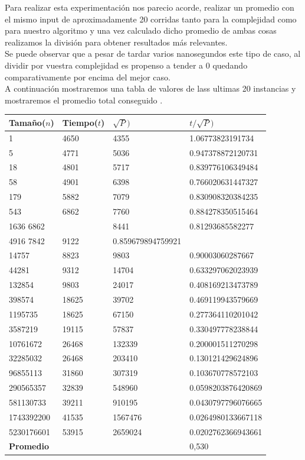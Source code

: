 Para realizar esta experimentaci\'on nos parecio acorde, realizar un promedio con el mismo input de aproximadamente 20 corridas
tanto para la complejidad como para nuestro algoritmo y una vez calculado dicho promedio de ambas cosas realizamos la divisi\'on para
obtener resultados m\'as relevantes.\\ 

Se puede observar que a pesar de tardar varios nanosegundos este tipo de caso, al dividir por vuestra complejidad
es propenso a tender a 0 quedando comparativamente por encima del mejor caso.\\

A continuaci\'on mostraremos una tabla de valores de lass ultimas 20 instancias y
mostraremos el promedio total conseguido .\\


\begin{table}[H]

    \begin{tabular}{ | l | l |l |l |}
    \hline
	Tamaño($n$) & Tiempo($t$) & \textbf{$\sqrt{P})$} & \textbf{$t/\sqrt{P})$}  \\ \hline
1 & 4650	 & 4355 &	1.06773823191734 \\ \hline
5 &	4771	 & 5036	& 0.947378872120731\\ \hline
18 &	4801	 & 5717	& 0.839776106349484\\ \hline
58 &	4901	 & 6398	& 0.766020631447327\\ \hline
179 &	5882	 & 7079	& 0.830908320384235\\ \hline
543	& 6862	&7760 &	0.884278350515464\\ \hline
1636	6862 &	&8441 &	0.81293685582277\\ \hline
4916	7842	 & 9122 & 	 0.859679894759921\\ \hline
14757 &	8823	 & 9803 &	0.90003060287667\\ \hline
44281 &	9312	 & 14704 &	0.633297062023939\\ \hline
132854 &	 9803	 & 24017 &	0.408169213473789\\ \hline
398574 &	 18625 & 	39702 &	0.469119943579669\\ \hline
1195735 &	18625 &	67150 &	0.277364110201042\\ \hline
3587219	& 19115	& 57837&	 0.330497778238844\\ \hline
10761672 	& 26468 &	132339 & 	0.200001511270298\\ \hline
32285032	 &26468& 	 203410	& 0.130121429624896\\ \hline
96855113 & 	31860 &	307319 & 	0.103670778572103\\ \hline
290565357 &	32839 &	548960 &	 0.0598203876420869\\ \hline
581130733 & 	39211 &	910195 &	 0.0430797796076665\\ \hline
1743392200 &	41535 &	1567476 &	0.0264980133667118\\ \hline
5230176601 &	53915 &	2659024	&0.0202762366943661\\ \hline

    \textbf{Promedio} & & & 0,530 \\ \hline
    \end{tabular}
\end{table}

